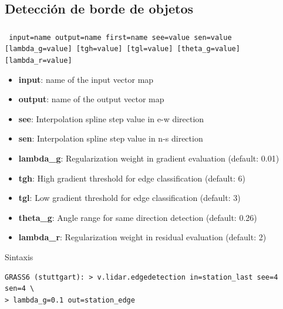 \subsection{Detección de borde de objetos}
\begin{frame}[fragile,shrink=10]
 \frametitle{}
\begin{beamerboxesrounded}[shadow=true]{\textbf{}\texttt{ input=name output=name first=name see=value sen=value [lambda\_g=value] [tgh=value] [tgl=value] [theta\_g=value] [lambda\_r=value]}}
\begin{itemize}
 \item \textbf{input}: name of the input vector map
 \item \textbf{output}: name of the output vector map
 \item \textbf{see}: Interpolation spline step value in e-w direction
 \item \textbf{sen}: Interpolation spline step value in n-s direction
 \item \textbf{lambda\_g}: Regularization weight in gradient evaluation (default: 0.01)
 \item \textbf{tgh}: High gradient threshold for edge classification (default: 6)
 \item \textbf{tgl}: Low gradient threshold for edge classification (default: 3)
 \item \textbf{theta\_g}: Angle range for same direction detection (default: 0.26)
 \item \textbf{lambda\_r}: Regularization weight in residual evaluation (default: 2)
\end{itemize}
\end{beamerboxesrounded}
\pause
 \begin{beamerboxesrounded}[shadow=true]{Sintaxis}
\scriptsize
\begin{verbatim}
GRASS6 (stuttgart): > v.lidar.edgedetection in=station_last see=4 sen=4 \
> lambda_g=0.1 out=station_edge
\end{verbatim}
\end{beamerboxesrounded}
\end{frame}
\pgfdeclareimage[width=0.65\textwidth]{edge}{images/edge}
